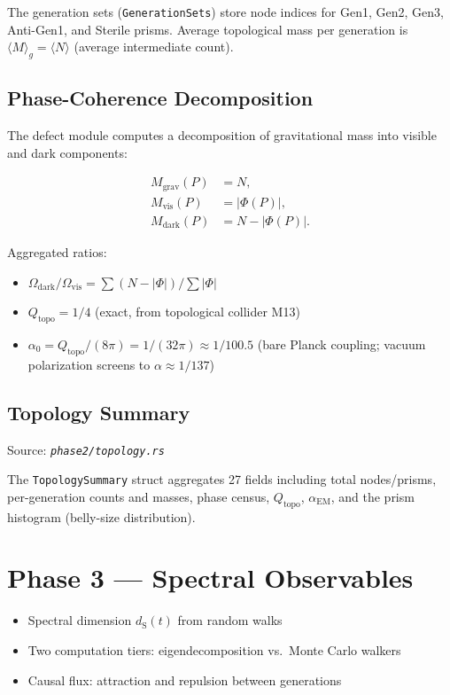 \documentclass[11pt, a4paper, openany]{book}
\newcommand{\dS}{d_{\mathrm{S}}}
\newcommand{\code}[1]{\texttt{#1}}
\newcommand{\file}[1]{\texttt{\itshape #1}}
\newenvironment{introduction}[1][Chapter Overview]{%
  \begin{tcolorbox}[
    enhanced,colback=structure!5,colframe=structure,
    colbacktitle=structure,coltitle=white,
    fonttitle=\small\bfseries,title={#1},
    arc=2pt,boxrule=0.7pt,
    left=8pt,right=8pt,top=6pt,bottom=6pt,
    before skip=12pt,after skip=12pt
  ]\itshape\begin{itemize}[leftmargin=*,itemsep=2pt,parsep=0pt]
}{%
  \end{itemize}\end{tcolorbox}
}
\begin{document}
The generation sets (\code{GenerationSets}) store node indices for Gen1, Gen2,
Gen3, Anti-Gen1, and Sterile prisms.  Average topological mass per generation is
$\langle M \rangle_g = \langle N \rangle$ (average intermediate count).

\section{Phase-Coherence Decomposition}

The defect module computes a decomposition of gravitational mass into visible
and dark components:

\begin{align}
  M_{\text{grav}}(P) &= N, \\
  M_{\text{vis}}(P)  &= |\Phi(P)|, \\
  M_{\text{dark}}(P) &= N - |\Phi(P)|.
\end{align}

Aggregated ratios:
\begin{itemize}
  \item $\Omega_{\text{dark}}/\Omega_{\text{vis}} =
        \sum(N - |\Phi|) / \sum |\Phi|$
  \item $Q_{\text{topo}} = 1/4$ (exact, from topological collider M13)
  \item $\alpha_0 = Q_{\text{topo}} / (8\pi) = 1/(32\pi) \approx 1/100.5$
        (bare Planck coupling; vacuum polarization screens to $\alpha \approx 1/137$)
\end{itemize}

\section{Topology Summary}

Source: \file{phase2/topology.rs}

The \code{TopologySummary} struct aggregates 27 fields including total nodes/prisms,
per-generation counts and masses, phase census, $Q_{\text{topo}}$, $\alpha_{\text{EM}}$,
and the prism histogram (belly-size distribution).


\chapter{Phase 3 --- Spectral Observables}

\begin{introduction}
  \item Spectral dimension $\dS(t)$ from random walks
  \item Two computation tiers: eigendecomposition vs.\ Monte Carlo walkers
  \item Causal flux: attraction and repulsion between generations
\end{introduction}
\end{document}
